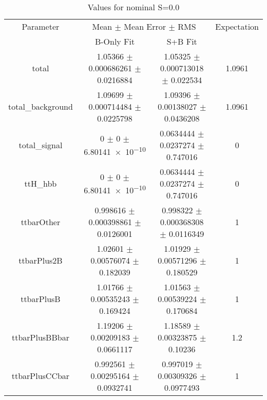 \begin{table}
\centering
\caption{Values for nominal S=0.0}
\begin{tabular}{cccc}
\toprule
Parameter & \multicolumn{2}{c}{Mean $\pm$ Mean Error $\pm$ RMS} & Expectation\\
 & B-Only Fit & S+B Fit & \\
\midrule
total & \num{1.05366} $\pm$ \num{0.000686261} $\pm$ \num{0.0216884} & \num{1.05325} $\pm$ \num{0.000713018} $\pm$ \num{0.022534} & \num{1.0961}\\
total\_background & \num{1.09699} $\pm$ \num{0.000714484} $\pm$ \num{0.0225798} & \num{1.09396} $\pm$ \num{0.00138027} $\pm$ \num{0.0436208} & \num{1.0961}\\
total\_signal & \num{0} $\pm$ \num{0} $\pm$ \num{6.80141e-10} & \num{0.0634444} $\pm$ \num{0.0237274} $\pm$ \num{0.747016} & \num{0}\\
ttH\_hbb & \num{0} $\pm$ \num{0} $\pm$ \num{6.80141e-10} & \num{0.0634444} $\pm$ \num{0.0237274} $\pm$ \num{0.747016} & \num{0}\\
ttbarOther & \num{0.998616} $\pm$ \num{0.000398861} $\pm$ \num{0.0126001} & \num{0.998322} $\pm$ \num{0.000368308} $\pm$ \num{0.0116349} & \num{1}\\
ttbarPlus2B & \num{1.02601} $\pm$ \num{0.00576074} $\pm$ \num{0.182039} & \num{1.01929} $\pm$ \num{0.00571296} $\pm$ \num{0.180529} & \num{1}\\
ttbarPlusB & \num{1.01766} $\pm$ \num{0.00535243} $\pm$ \num{0.169424} & \num{1.01563} $\pm$ \num{0.00539224} $\pm$ \num{0.170684} & \num{1}\\
ttbarPlusBBbar & \num{1.19206} $\pm$ \num{0.00209183} $\pm$ \num{0.0661117} & \num{1.18589} $\pm$ \num{0.00323875} $\pm$ \num{0.10236} & \num{1.2}\\
ttbarPlusCCbar & \num{0.992561} $\pm$ \num{0.00295164} $\pm$ \num{0.0932741} & \num{0.997019} $\pm$ \num{0.00309326} $\pm$ \num{0.0977493} & \num{1}\\
\bottomrule
\end{tabular}
\end{table}